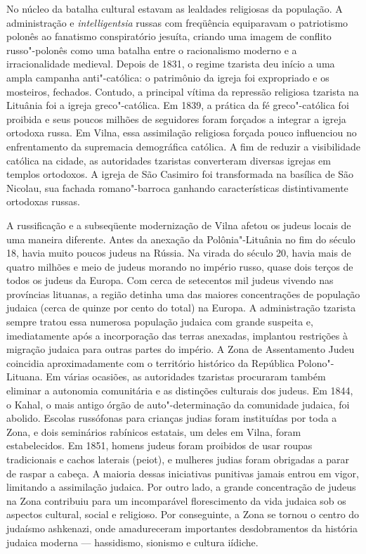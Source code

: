 No núcleo da batalha cultural estavam as lealdades religiosas da
população. A administração e \emph{intelligentsia} russas com freqüência
equiparavam o patriotismo polonês ao fanatismo conspiratório jesuíta,
criando uma imagem de conflito russo"-polonês como uma batalha entre o
racionalismo moderno e a irracionalidade medieval. Depois de 1831, o
regime tzarista deu início a uma ampla campanha anti"-católica: o
patrimônio da igreja foi expropriado e os mosteiros, fechados. Contudo,
a principal vítima da repressão religiosa tzarista na Lituânia foi a
igreja greco"-católica. Em 1839, a prática da fé greco"-católica foi
proibida e seus poucos milhões de seguidores foram forçados a integrar a
igreja ortodoxa russa. Em Vilna, essa assimilação religiosa forçada
pouco influenciou no enfrentamento da supremacia demográfica católica. A
fim de reduzir a visibilidade católica na cidade, as autoridades
tzaristas converteram diversas igrejas em templos ortodoxos. A igreja de
São Casimiro foi transformada na basílica de São Nicolau, sua fachada
romano"-barroca ganhando características distintivamente ortodoxas
russas.

%

A russificação e a subseqüente modernização de Vilna afetou os judeus
locais de uma maneira diferente. Antes da anexação da Polônia"-Lituânia
no fim do século 18, havia muito poucos judeus na Rússia. Na virada do
século 20, havia mais de quatro milhões e meio de judeus morando no
império russo, quase dois terços de todos os judeus da Europa. Com cerca
de setecentos mil judeus vivendo nas províncias lituanas, a região
detinha uma das maiores concentrações de população judaica (cerca de
quinze por cento do total) na Europa. A administração tzarista sempre
tratou essa numerosa população judaica com grande suspeita e,
imediatamente após a incorporação das terras anexadas, implantou
restrições à migração judaica para outras partes do império. A Zona de
Assentamento Judeu coincidia aproximadamente com o território histórico
da República Polono"-Lituana. Em várias ocasiões, as autoridades
tzaristas procuraram também eliminar a autonomia comunitária e as
distinções culturais dos judeus. Em 1844, o Kahal, o mais antigo órgão
de auto"-determinação da comunidade judaica, foi abolido. Escolas
russófonas para crianças judias foram instituídas por toda a Zona, e
dois seminários rabínicos estatais, um deles em Vilna, foram
estabelecidos. Em 1851, homens judeus foram proibidos de usar roupas
tradicionais e cachos laterais (peiot), e mulheres judias foram
obrigadas a parar de raspar a cabeça. A maioria dessas iniciativas
punitivas jamais entrou em vigor, limitando a assimilação judaica. Por
outro lado, a grande concentração de judeus na Zona contribuiu para um
incomparável florescimento da vida judaica sob os aspectos cultural,
social e religioso. Por conseguinte, a Zona se tornou o centro do
judaísmo ashkenazi, onde amadureceram importantes desdobramentos da
história judaica moderna --- hassidismo, sionismo e cultura iídiche.

